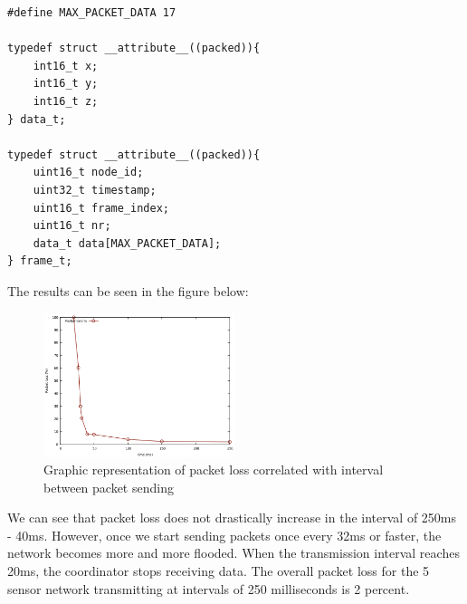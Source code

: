\begin{lstlisting}
#define MAX_PACKET_DATA 17

typedef struct __attribute__((packed)){
	int16_t x;
	int16_t y;
	int16_t z;
} data_t;

typedef struct __attribute__((packed)){
	uint16_t node_id;
	uint32_t timestamp;
	uint16_t frame_index;
	uint16_t nr;
	data_t data[MAX_PACKET_DATA];
} frame_t;
\end{lstlisting}

The results can be seen in the figure below:

\begin{figure}[ht] \centering
  \includegraphics[width=0.5\textwidth]{img/packet-loss.png}
  \caption{Graphic representation of packet loss correlated with interval between packet sending}
\end{figure}

We can see that packet loss does not drastically increase in the interval of 250ms - 40ms. However, 
once we start sending packets once every 32ms or faster, the network becomes more and more flooded.
When the transmission interval reaches 20ms, the coordinator stops receiving data. The overall packet
loss for the 5 sensor network transmitting at intervals of 250 milliseconds is 2 percent. 
